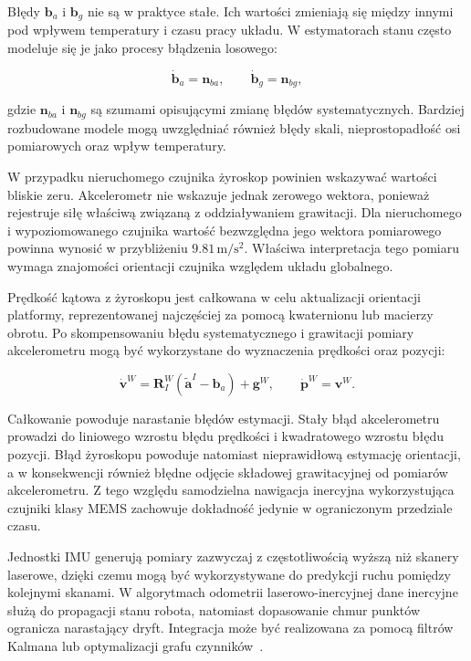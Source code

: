\documentclass[a4paper,twoside,12pt]{book}
\begin{document}
Błędy $\mathbf{b}_{a}$ i $\mathbf{b}_{g}$ nie są w praktyce stałe. Ich wartości zmieniają się między innymi pod wpływem temperatury i czasu pracy układu. W estymatorach stanu często modeluje się je jako procesy błądzenia losowego:

\begin{equation}
    \dot{\mathbf{b}}_{a} = \mathbf{n}_{ba},
    \qquad
    \dot{\mathbf{b}}_{g} = \mathbf{n}_{bg},
    \label{eq:imu_bias_random_walk}
\end{equation}

gdzie $\mathbf{n}_{ba}$ i $\mathbf{n}_{bg}$ są szumami opisującymi zmianę błędów systematycznych. Bardziej rozbudowane modele mogą uwzględniać również błędy skali, nieprostopadłość osi pomiarowych oraz wpływ temperatury.

W przypadku nieruchomego czujnika żyroskop powinien wskazywać wartości bliskie zeru. Akcelerometr nie wskazuje jednak zerowego wektora, ponieważ rejestruje siłę właściwą związaną z oddziaływaniem grawitacji. Dla nieruchomego i wypoziomowanego czujnika wartość bezwzględna jego wektora pomiarowego powinna wynosić w przybliżeniu $9.81\,\mathrm{m/s^2}$. Właściwa interpretacja tego pomiaru wymaga znajomości orientacji czujnika względem układu globalnego.

Prędkość kątowa z żyroskopu jest całkowana w celu aktualizacji orientacji platformy, reprezentowanej najczęściej za pomocą kwaternionu lub macierzy obrotu. Po skompensowaniu błędu systematycznego i grawitacji pomiary akcelerometru mogą być wykorzystane do wyznaczenia prędkości oraz pozycji:

\begin{equation}
    \dot{\mathbf{v}}^{W}
    =
    \mathbf{R}^{W}_{I}
    \left(
        \widetilde{\mathbf{a}}^{I} - \mathbf{b}_{a}
    \right)
    +
    \mathbf{g}^{W},
    \qquad
    \dot{\mathbf{p}}^{W} = \mathbf{v}^{W}.
    \label{eq:imu_state_propagation}
\end{equation}

Całkowanie powoduje narastanie błędów estymacji. Stały błąd akcelerometru prowadzi do liniowego wzrostu błędu prędkości i kwadratowego wzrostu błędu pozycji. Błąd żyroskopu powoduje natomiast nieprawidłową estymację orientacji, a w konsekwencji również błędne odjęcie składowej grawitacyjnej od pomiarów akcelerometru. Z tego względu samodzielna nawigacja inercyjna wykorzystująca czujniki klasy MEMS zachowuje dokładność jedynie w ograniczonym przedziale czasu.

Jednostki IMU generują pomiary zazwyczaj z częstotliwością wyższą niż skanery laserowe, dzięki czemu mogą być wykorzystywane do predykcji ruchu pomiędzy kolejnymi skanami. W algorytmach odometrii laserowo-inercyjnej dane inercyjne służą do propagacji stanu robota, natomiast dopasowanie chmur punktów ogranicza narastający dryft. Integracja może być realizowana za pomocą filtrów Kalmana lub optymalizacji grafu czynników~\cite{lidar_inertial_odometry_tight_coupled,motion_deskewing_lidar}.
\end{document}
